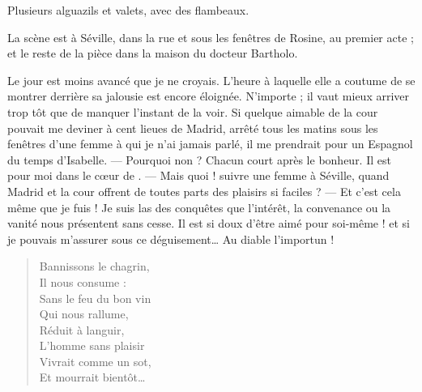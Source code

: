 \documentclass[11pt]{book}
\begin{document}
\begin{dramatis}



\end{dramatis}

Plusieurs alguazils et valets, avec des flambeaux.

\begin{dida}
La scène est à Séville, dans la rue et sous les fenêtres de Rosine, au premier acte ; et le reste de la pièce dans la maison du docteur Bartholo.
\end{dida}

\newpage

\mainmatter

\act{}

\scene{}
\onstage{\comtename}

    Le jour est moins avancé que je ne croyais. L’heure à laquelle elle a coutume de se montrer derrière sa jalousie est encore éloignée. N’importe ; il vaut mieux arriver trop tôt que de manquer l’instant de la voir. Si quelque aimable de la cour pouvait me deviner à cent lieues de Madrid,  arrêté tous les matins sous les fenêtres d’une femme à qui je n’ai jamais parlé, il me prendrait pour un Espagnol du temps d’Isabelle. — Pourquoi non ? Chacun court après le bonheur.  Il est pour moi dans le cœur de \rosinename. — Mais quoi ! suivre une femme à Séville, quand Madrid et la cour offrent de toutes parts des plaisirs si faciles ? — Et c’est cela même que je fuis ! Je suis las des conquêtes que l’intérêt, la convenance ou la vanité nous présentent sans cesse. Il est si doux d’être aimé pour soi-même ! et si je pouvais m’assurer sous ce déguisement… Au diable l’importun !
    
\scene{}


\begin{verse}
Bannissons le chagrin,\\
Il nous consume :\\
Sans le feu du bon vin\\
  Qui nous rallume,\\
Réduit à languir,\\
L’homme sans plaisir \\
Vivrait comme un sot,\\
Et mourrait bientôt…
\end{verse}
\end{document}
